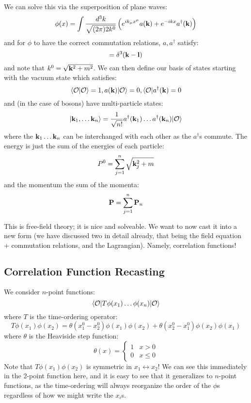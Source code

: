 We can solve this via the superposition of plane waves:
\begin{equation}
    \phi(x) = \int \frac{d^3k}{\sqrt{(2\pi)2k^0}}\left(e^{ik_\mu x^\mu}a(\v{k}) + e^{-ikx}a^\dag(\v{k})\right)
\end{equation}
and for $\phi$ to have the correct commutation relations, $a, a^\dag$ satisfy:
\begin{equation}
    [a(\v{k}), a^\dag(\v{l})] = \delta^3(\v{k} - \v{l})
\end{equation}
and note that $k^0 = \sqrt{\mathbf{k}^2 + m^2}$. We can then define our basis of states starting with the vacuum state which satisfies:
\begin{equation}
    \langle \mathcal{O} \lvert \mathcal{O} \rangle = 1, a(\mathbf{k})\lvert \mathcal{O} \rangle = 0, \langle \mathcal{O} \rvert a^\dagger(\mathbf{k}) = 0
\end{equation}
and (in the case of bosons) have multi-particle states:
\begin{equation}
    \lvert \mathbf{k}_1, \ldots \mathbf{k}_n \rangle = \frac{1}{\sqrt{n!}}a^\dagger(\mathbf{k}_1)\ldots a^\dagger(\mathbf{k}_n)\lvert \mathcal{O} \rangle
\end{equation}
where the $\mathbf{k}_1 \ldots \mathbf{k}_n$ can be interchanged with each other as the $a^\dag$s commute. The energy is just the sum of the energies of each particle:
\begin{equation}
    P^0 = \sum_{j=1}^n \sqrt{\mathbf{k}_j^2 + m}
\end{equation}
and the momentum the sum of the momenta:
\begin{equation}
    \mathbf{P} = \sum_{j=1}^n \mathbf{P}_n
\end{equation}

This is free-field theory; it is nice and solveable. We want to now cast it into a new form (we have discussed two in detail already, that being the field equation + commutation relations, and the Lagrangian). Namely, correlation functions!

\subsection{Correlation Function Recasting}
We consider $n$-point functions:
\begin{equation}
    \bra{\O}T\phi(x_1) \ldots \phi(x_n)\ket{\O}
\end{equation}
where $T$ is the time-ordering operator:
\begin{equation}
    T\phi(x_1)\phi(x_2) = \theta(x_1^0 - x_2^0)\phi(x_1)\phi(x_2) + \theta(x_2^0 - x_1^0)\phi(x_2)\phi(x_1)
\end{equation}
where $\theta$ is the Heaviside step function:
\begin{equation}
    \theta(x) = \begin{cases}
        1 & x > 0
        \\ 0 & x \leq 0
    \end{cases}
\end{equation}
Note that $T\phi(x_1)\phi(x_2)$ is symmetric in $x_1 \leftrightarrow x_2$! We can see this immediately in the 2-point function here, and it is easy to see that it generalizes to $n$-point functions, as the time-ordering will always reorganize the order of the $\phi$s regardless of how we might write the $x_i$s. 

